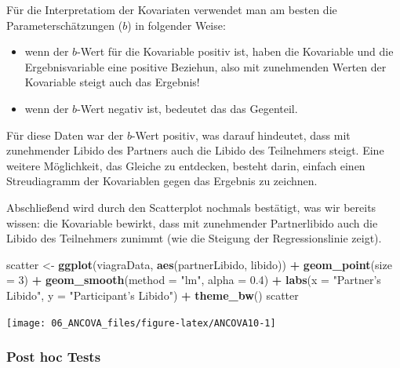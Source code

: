 \documentclass[]{article}
\newenvironment{Shaded}{\begin{snugshade}}{\end{snugshade}}
\newcommand{\DataTypeTok}[1]{\textcolor[rgb]{0.13,0.29,0.53}{#1}}
\newcommand{\DecValTok}[1]{\textcolor[rgb]{0.00,0.00,0.81}{#1}}
\newcommand{\FloatTok}[1]{\textcolor[rgb]{0.00,0.00,0.81}{#1}}
\newcommand{\KeywordTok}[1]{\textcolor[rgb]{0.13,0.29,0.53}{\textbf{#1}}}
\newcommand{\NormalTok}[1]{#1}
\newcommand{\OperatorTok}[1]{\textcolor[rgb]{0.81,0.36,0.00}{\textbf{#1}}}
\newcommand{\StringTok}[1]{\textcolor[rgb]{0.31,0.60,0.02}{#1}}
\providecommand{\tightlist}{%
  \setlength{\itemsep}{0pt}\setlength{\parskip}{0pt}}
\begin{document}
Für die Interpretatiom der Kovariaten verwendet man am besten die Parameterschätzungen (\(b\)) in folgender Weise:

\begin{itemize}
\tightlist
\item
  wenn der \(b\)-Wert für die Kovariable positiv ist, haben die Kovariable und die Ergebnisvariable eine positive Beziehun, also mit zunehmenden Werten der Kovariable steigt auch das Ergebnis!
\item
  wenn der \(b\)-Wert negativ ist, bedeutet das das Gegenteil.
\end{itemize}

Für diese Daten war der \(b\)-Wert positiv, was darauf hindeutet, dass mit zunehmender Libido des Partners auch die Libido des Teilnehmers steigt. Eine weitere Möglichkeit, das Gleiche zu entdecken, besteht darin, einfach einen Streudiagramm der Kovariablen gegen das Ergebnis zu zeichnen.

Abschließend wird durch den Scatterplot nochmals bestätigt, was wir bereits wissen: die Kovariable bewirkt, dass mit zunehmender Partnerlibido auch die Libido des Teilnehmers zunimmt (wie die Steigung der Regressionslinie zeigt).

\begin{Shaded}
\begin{Highlighting}[]
\NormalTok{    scatter <-}\StringTok{ }\KeywordTok{ggplot}\NormalTok{(viagraData, }\KeywordTok{aes}\NormalTok{(partnerLibido, libido)) }\OperatorTok{+}
\StringTok{      }\KeywordTok{geom_point}\NormalTok{(}\DataTypeTok{size =} \DecValTok{3}\NormalTok{) }\OperatorTok{+}\StringTok{ }
\StringTok{      }\KeywordTok{geom_smooth}\NormalTok{(}\DataTypeTok{method =} \StringTok{"lm"}\NormalTok{, }\DataTypeTok{alpha =} \FloatTok{0.4}\NormalTok{) }\OperatorTok{+}\StringTok{ }
\StringTok{      }\KeywordTok{labs}\NormalTok{(}\DataTypeTok{x =} \StringTok{"Partner's Libido"}\NormalTok{, }\DataTypeTok{y =} \StringTok{"Participant's Libido"}\NormalTok{) }\OperatorTok{+}
\StringTok{      }\KeywordTok{theme_bw}\NormalTok{()}
\NormalTok{    scatter}
\end{Highlighting}
\end{Shaded}

\begin{center}\texttt{[image: 06\_ANCOVA\_files/figure-latex/ANCOVA10-1]} \end{center}

\hypertarget{post-hoc-tests}{%
\subsubsection*{Post hoc Tests}\label{post-hoc-tests}}
\end{document}
